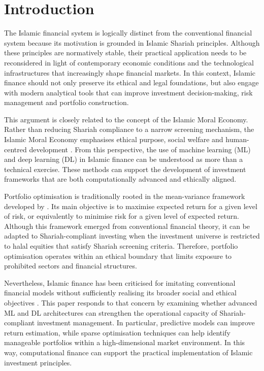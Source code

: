 \section{Introduction}

The Islamic financial system is logically distinct from the conventional financial system because its motivation is grounded in Islamic Shariah principles. Although these principles are normatively stable, their practical application needs to be reconsidered in light of contemporary economic conditions and the technological infrastructures that increasingly shape financial markets. In this context, Islamic finance should not only preserve its ethical and legal foundations, but also engage with modern analytical tools that can improve investment decision-making, risk management and portfolio construction.

This argument is closely related to the concept of the Islamic Moral Economy. Rather than reducing Shariah compliance to a narrow screening mechanism, the Islamic Moral Economy emphasises ethical purpose, social welfare and human-centred development \citep{asutay2007conceptualisation, asutay2012conceptualising}. From this perspective, the use of machine learning (ML) and deep learning (DL) in Islamic finance can be understood as more than a technical exercise. These methods can support the development of investment frameworks that are both computationally advanced and ethically aligned.

Portfolio optimisation is traditionally rooted in the mean-variance framework developed by \citet{markowitz1952portfolio}. Its main objective is to maximise expected return for a given level of risk, or equivalently to minimise risk for a given level of expected return. Although this framework emerged from conventional financial theory, it can be adapted to Shariah-compliant investing when the investment universe is restricted to halal equities that satisfy Shariah screening criteria. Therefore, portfolio optimisation operates within an ethical boundary that limits exposure to prohibited sectors and financial structures.

Nevertheless, Islamic finance has been criticised for imitating conventional financial models without sufficiently realising its broader social and ethical objectives \citep{asutay2007conceptualisation}. This paper responds to that concern by examining whether advanced ML and DL architectures can strengthen the operational capacity of Shariah-compliant investment management. In particular, predictive models can improve return estimation, while sparse optimisation techniques can help identify manageable portfolios within a high-dimensional market environment. In this way, computational finance can support the practical implementation of Islamic investment principles.

